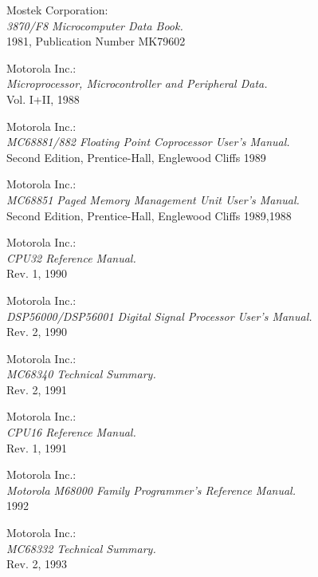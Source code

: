  Mostek Corporation: \\
                     {\em 3870/F8 Microcomputer Data Book.\/} \\
                     1981, Publication Number MK79602

 Motorola Inc.: \\
                 {\em Microprocessor, Microcontroller and Peripheral
                 Data.\/} \\
		 Vol. I+II, 1988

 Motorola Inc.: \\
                {\em MC68881/882 Floating Point Coprocessor User's
                Manual.\/} \\
                Second Edition, Prentice-Hall, Englewood Cliffs 1989

 Motorola Inc.: \\
                {\em MC68851 Paged Memory Management Unit User's
                Manual.\/} \\
                Second Edition, Prentice-Hall, Englewood Cliffs 1989,1988

 Motorola Inc.: \\
                {\em CPU32 Reference Manual.\/} \\
                Rev. 1, 1990

 Motorola Inc.: \\
                {\em DSP56000/DSP56001 Digital Signal Processor User's
                Manual.\/} \\
                Rev. 2, 1990

 Motorola Inc.: \\
                 {\em MC68340 Technical Summary.\/} \\
                 Rev. 2, 1991

 Motorola Inc.: \\
                {\em CPU16 Reference Manual.\/} \\
                Rev. 1, 1991

 Motorola Inc.: \\
                 {\em Motorola M68000 Family Programmer's
                  Reference Manual.\/} \\
                 1992

 Motorola Inc.: \\
                 {\em MC68332 Technical Summary.\/} \\
                 Rev. 2, 1993

